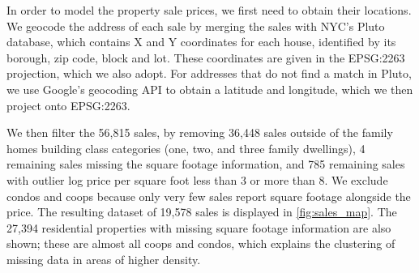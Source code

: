 In order to model the property sale prices, we first need to obtain their locations.
We geocode the address of each sale by merging the sales with NYC's Pluto database, which contains X and Y coordinates for each house, identified by its borough, zip code, block and lot.
These coordinates are given in the EPSG:2263 projection, which we also adopt.
For addresses that do not find a match in Pluto, we use Google's geocoding API to obtain a latitude and longitude, which we then project onto EPSG:2263.

We then filter the 56,815 sales, by removing
36,448 sales outside of the family homes building class categories (one, two, and three family dwellings),
4 remaining sales missing the square footage information,
and 785 remaining sales with outlier log price per square foot less than 3 or more than 8.
We exclude condos and coops because only very few sales report square footage alongside the price.
The resulting dataset of 19,578 sales is displayed in \autoref{fig:sales_map}.
The 27,394 residential properties with missing square footage information are also shown;
these are almost all coops and condos, which explains the clustering of missing data in areas of higher density.

